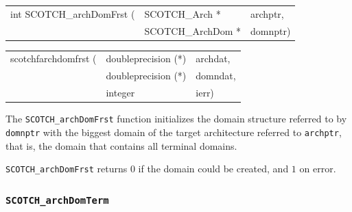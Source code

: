\begin{itemize}
\progsyn

{\tt\begin{tabular}{l@{}ll}
int SCOTCH\_archDomFrst ( & SCOTCH\_Arch *    & archptr, \\
                          & SCOTCH\_ArchDom * & domnptr) \\
\end{tabular}}

{\tt\begin{tabular}{l@{}ll}
scotchfarchdomfrst ( & doubleprecision (*) & archdat, \\
                     & doubleprecision (*) & domndat, \\
                     & integer             & ierr)
\end{tabular}}

\progdes

The {\tt SCOTCH\_archDomFrst} function initializes the domain
structure referred to by {\tt domnptr} with the biggest domain
of the target architecture referred to {\tt archptr}, that is, the
domain that contains all terminal domains.

\progret

{\tt SCOTCH\_archDomFrst} returns $0$ if the domain could be created,
and $1$ on error.
\end{itemize}

\subsubsection{{\tt SCOTCH\_archDomTerm}}

